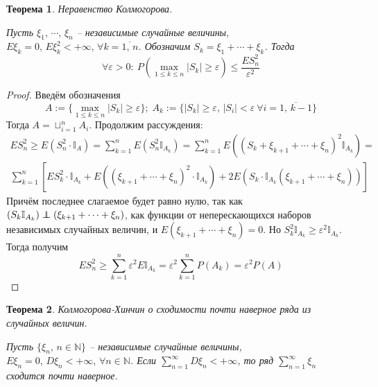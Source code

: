 \documentclass[a4paper,12pt]{article}
\renewcommand{\leq}{\ensuremath{\leqslant}}
\renewcommand{\geq}{\ensuremath{\geqslant}}
\newcommand\independent{\protect\mathpalette{\protect\independenT}{\perp}}
\def\independenT#1#2{\mathrel{\rlap{$#1#2$}\mkern2mu{#1#2}}}
\theoremstyle{plain}
\newtheorem{theorem}{Теорема}[section]
\theoremstyle{definition}
\theoremstyle{remark}
\begin{document}
\begin{theorem}
	Неравенство Колмогорова. 

	Пусть $\xi_1,\,\cdots,\,\xi_n$ -- независимые случайные величины, $E\xi_k = 0,\, E\xi_k^2 < +\infty,\, \forall k = \overline{1,\,n}$. Обозначим $S_k = \xi_1 + \cdots + \xi_k$. Тогда
	\[\forall \varepsilon > 0:\: P\left(\max_{1 \leq k \leq n} |S_k| \geq \varepsilon\right) \leq \frac{ES_n^2}{\varepsilon^2}\]
\end{theorem}

\begin{proof}
	Введём обозначения 
	\[A := \{\max_{1 \leq k \leq n} |S_k| \geq \varepsilon\};\; A_k := \{|S_k| \geq \varepsilon,\, |S_i| < \varepsilon \: \forall i = \overline{1,\,k-1}\}\]
	Тогда $A = \sqcup_{i = 1}^n A_i$. Продолжим рассуждения:
	\begin{align*}
		ES_n^2 \geq E(S_n^2 \cdot\mathbb{I}_A) = \sum_{k = 1}^n E(S_n^2\mathbb{I}_{A_k}) = \sum_{k = 1}^n E((S_k + \xi_{k + 1} + \cdots + \xi_n)^2\mathbb{I}_{A_k}) = \\
		\sum_{k = 1}^n \left[ES_k^2\cdot\mathbb{I}_{A_k} + E\left((\xi_{k + 1} + \cdots + \xi_n)^2\cdot\mathbb{I}_{A_k}\right) + 2E(S_k\cdot\mathbb{I}_{A_k}(\xi_{k + 1} + \cdots + \xi_n)) \right]
	\end{align*}
	Причём последнее слагаемое будет равно нулю, так как $(S_k\mathbb{I}_{A_k}) \independent (\xi_{k + 1} + \cdots + \xi_n)$, как функции от неперескающихся наборов независимых случайных величин, и $E(\xi_{k + 1} + \cdots + \xi_n) = 0$. Но $S_k^2\mathbb{I}_{A_k} \geq \varepsilon^2\mathbb{I}_{A_k}$. Тогда получим
	\[ES_n^2 \geq \sum_{k = 1}^n\varepsilon^2E\mathbb{I}_{A_k} = \varepsilon^2 \sum_{k = 1}^n P(A_k) = \varepsilon^2 P(A)\]
\end{proof}

\begin{theorem}
	Колмогорова-Хинчин о сходимости почти наверное ряда из случайных величин.

	Пусть $\{\xi_n,\, n \in \mathbb{N}\}$ -- независимые случайные величины, $E\xi_n = 0,\, D\xi_n < +\infty,\, \forall n \in \mathbb{N}$. Если $\sum_{n = 1}^\infty D\xi_n < +\infty$, то ряд $\sum_{n = 1}^\infty \xi_n$ сходится почти наверное.
\end{theorem}
\end{document}
